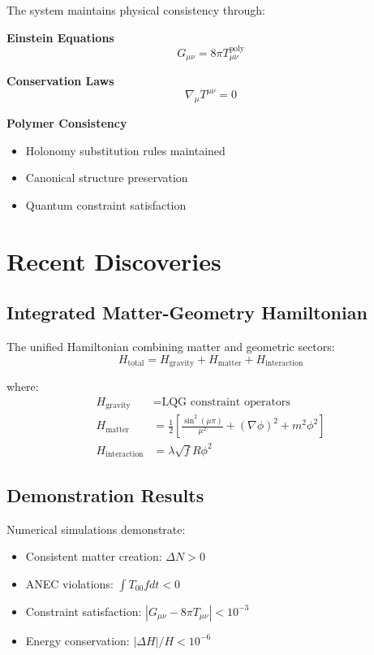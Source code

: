\documentclass[11pt]{article}
\begin{document}
The system maintains physical consistency through:

\textbf{Einstein Equations}
\begin{equation}
G_{\mu\nu} = 8\pi T_{\mu\nu}^{\text{poly}}
\end{equation}

\textbf{Conservation Laws}
\begin{equation}
\nabla_\mu T^{\mu\nu} = 0
\end{equation}

\textbf{Polymer Consistency}
\begin{itemize}
\item Holonomy substitution rules maintained
\item Canonical structure preservation
\item Quantum constraint satisfaction
\end{itemize}

\section{Recent Discoveries}

\subsection{Integrated Matter-Geometry Hamiltonian}

The unified Hamiltonian combining matter and geometric sectors:
\begin{equation}
H_{\text{total}} = H_{\text{gravity}} + H_{\text{matter}} + H_{\text{interaction}}
\end{equation}

where:
\begin{align}
H_{\text{gravity}} &= \text{LQG constraint operators} \\
H_{\text{matter}} &= \frac{1}{2}\left[\frac{\sin^2(\mu\pi)}{\mu^2} + (\nabla\phi)^2 + m^2\phi^2\right] \\
H_{\text{interaction}} &= \lambda\sqrt{f}R\phi^2
\end{align}

\subsection{Demonstration Results}

Numerical simulations demonstrate:
\begin{itemize}
\item Consistent matter creation: $\Delta N > 0$
\item ANEC violations: $\int T_{00} f dt < 0$
\item Constraint satisfaction: $|G_{\mu\nu} - 8\pi T_{\mu\nu}| < 10^{-3}$
\item Energy conservation: $|\Delta H|/H < 10^{-6}$
\end{itemize}
\end{document}
